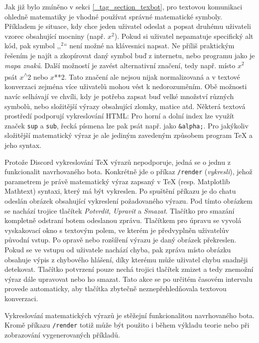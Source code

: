 \documentclass[FM]{tulthesis}
\begin{document}
	Jak již bylo zmíněno v sekci \ref{_tag_section_texbot}, pro textovou komunikaci ohledně matematiky je vhodné používat správné matematické symboly. Příkladem je situace, kdy chce jeden uživatel odeslat a popsat druhému uživateli vzorec obsahující mocniny (např. $x^2$). Pokud si uživatel nepamatuje specifický alt kód, pak symbol ,,$^2$`` není možné na klávesnici napsat. Ne příliš praktickým řešením je najít a zkopírovat daný symbol buď z internetu, nebo programu jako je \textit{mapa znaků}. Další možností je zavést alternativní značení, tedy např. místo $x^2$ psát $x$\textsuperscript{$\wedge$}2 nebo $x$**2. Tato značení ale nejsou nijak normalizovaná a v textové konverzaci zejména více uživatelů mohou vést k nedorozuměním. Obě možnosti navíc selhávají ve chvíli, kdy je potřeba zapsat buď velké množství různých symbolů, nebo složitější výrazy obsahující zlomky, matice atd. Některá textová prostředí podporují vykreslování HTML: Pro horní a dolní index lze využít značek \verb|sup| a \verb|sub|, řecká písmena lze pak psát např. jako \verb|&alpha;|. Pro jakýkoliv složitější matematický výraz je ale jediným zavedeným způsobem program TeX a jeho syntax.
	
	Protože Discord vykreslování TeX výrazů nepodporuje, jedná se o jednu z funkcionalit navrhovaného bota. Konkrétně jde o příkaz \verb|/render| (\textit{vykresli}), jehož parametrem je právě matematický výraz zapsaný v TeX (resp. Matplotlib Mathtext) syntaxi, který má být vykreslen. Po spuštění příkazu je do chatu odeslán obrázek obsahující vykreslení požadovaného výrazu. Pod tímto obrázkem se nachází trojice tlačítek \textit{Potvrdit}, \textit{Upravit} a \textit{Smazat}. Tlačítko pro smazání kompletně odstraní botem odeslanou zprávu. Tlačítkem pro úpravu se vyvolá vyskakovací okno s textovým polem, ve kterém je předvyplněn uživatelův původní vstup. Po opravě nebo rozšíření výrazu je daný obrázek překreslen. Pokud se ve vstupu od uživatele nachází chyba, pak zpráva místo obrázku obsahuje výpis z chybového hlášení, díky kterému může uživatel chybu snadněji detekovat. Tlačítko potvrzení pouze nechá trojici tlačítek zmizet a tedy znemožní výraz dále upravovat nebo ho smazat. Tato akce se po určitém časovém intervalu provede automaticky, aby tlačítka zbytečně neznepřehledňovala textovou konverzaci.
	
	Vykreslování matematických výrazů je stěžejní funkcionalitou navrhovaného bota. Kromě příkazu \verb|/render| totiž může být použito i během výkladu teorie nebo při zobrazování vygenerovaných příkladů.
	
\end{document}
